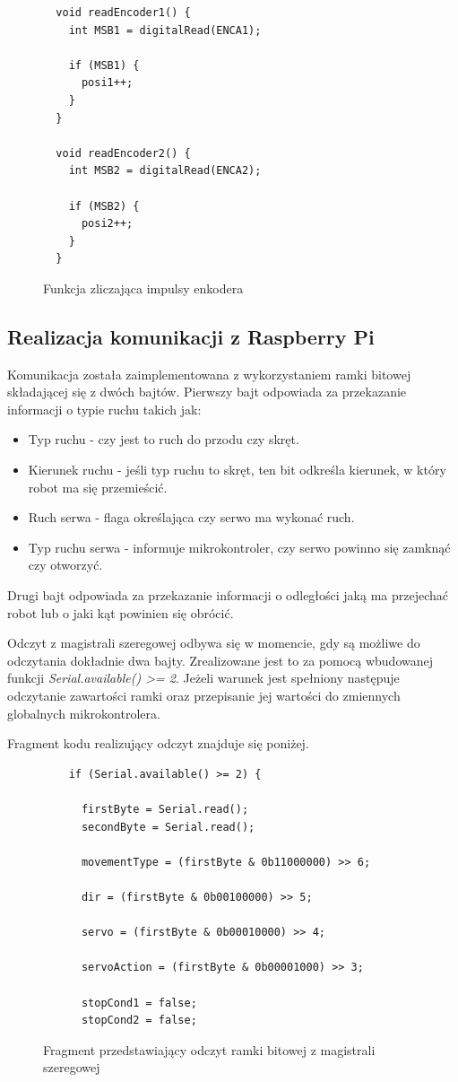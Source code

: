 \begin{figure}[h!]
  \centering
  \begin{lstlisting}   
  void readEncoder1() {
    int MSB1 = digitalRead(ENCA1);

    if (MSB1) {  
      posi1++;  
    }
  }

  void readEncoder2() {
    int MSB2 = digitalRead(ENCA2);

    if (MSB2) {  
      posi2++; 
    }
  }
  \end{lstlisting}
  \caption{Funkcja zliczająca impulsy enkodera}
  \label{fig:enc-count}
\end{figure}

\subsection{Realizacja komunikacji z Raspberry Pi}

Komunikacja została zaimplementowana z wykorzystaniem ramki bitowej składającej się z dwóch bajtów. Pierwszy bajt odpowiada za przekazanie informacji o typie ruchu takich jak:
\begin{itemize}
  \item Typ ruchu - czy jest to ruch do przodu czy skręt.
  \item Kierunek ruchu - jeśli typ ruchu to skręt, ten bit odkreśla kierunek, w który robot ma się przemieścić.
  \item Ruch serwa - flaga określająca czy serwo ma wykonać ruch.
  \item Typ ruchu serwa - informuje mikrokontroler, czy serwo powinno się zamknąć czy otworzyć. 
\end{itemize}

Drugi bajt odpowiada za przekazanie informacji o odległości jaką ma przejechać robot lub o jaki kąt powinien się obrócić. 

Odczyt z magistrali szeregowej odbywa się w momencie, gdy są możliwe do odczytania dokładnie dwa bajty. Zrealizowane jest to za pomocą wbudowanej funkcji \textit{Serial.available() >= 2}. Jeżeli warunek jest spełniony następuje odczytanie zawartości ramki oraz przepisanie jej wartości do zmiennych globalnych mikrokontrolera. 

Fragment kodu realizujący odczyt znajduje się poniżej.

\begin{figure}[h!]
  \centering
  \begin{lstlisting}
    if (Serial.available() >= 2) {  
      
      firstByte = Serial.read();
      secondByte = Serial.read();

      movementType = (firstByte & 0b11000000) >> 6;

      dir = (firstByte & 0b00100000) >> 5;

      servo = (firstByte & 0b00010000) >> 4;

      servoAction = (firstByte & 0b00001000) >> 3;

      stopCond1 = false;
      stopCond2 = false;
  \end{lstlisting}
  \caption{Fragment przedstawiający odczyt ramki bitowej z magistrali szeregowej}
  \label{fig:read-uart}
\end{figure}

